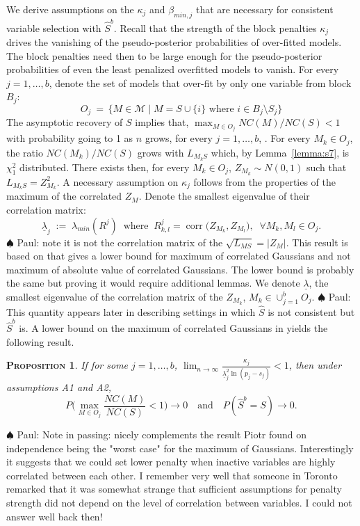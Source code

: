 \documentclass[aos]{imsart}
\theoremstyle{plain}
\newtheorem{prop}[thm]{\textsc{Proposition}}
\newcommand{\paul}[1]{{\small{\color{green} \sf $\spadesuit$ Paul: #1}}}
\newcommand{\M}{\mathcal{M}}
\begin{document}
We derive assumptions on the $\kappa_j$ and $\beta_{min,j}$ that are necessary for consistent variable selection with $\hat{S}^b$. Recall that the strength of the block penalties $\kappa_j$ drives the vanishing of the pseudo-posterior probabilities of over-fitted models. The block penalties need then to be large enough for the pseudo-posterior probabilities of even the least penalized overfitted models to vanish. For every $j=1,\ldots,b$, denote the set of models that over-fit by only one variable from block $B_j$:
$$O_j \:=\,\{M\in \M\;|\; M=S\cup\{i\} \text{ where } i\in B_j\setminus S_j\}$$
The asymptotic recovery of $S$ implies that, $\max_{M\in O_j}NC(M)/NC(S)<1$ with probability going to 1 as $n$ grows, for every $j=1,\ldots,b$, . For every $M_k\in O_j$, the ratio $NC(M_k)/NC(S)$ grows with $L_{M_kS}$ which, by Lemma~\ref{lemma:s7}, is $\chi^2_1$ distributed. There exists then, for every $M_k\in O_j$, $Z_{M_k} \sim N(0,1)$ such that $L_{M_kS}=Z_{M_k}^2$. A necessary assumption on $\kappa_j$ follows from the properties of the maximum of the correlated $Z_M$. Denote the smallest eigenvalue of their correlation matrix:
\begin{equation}
    \underline{\lambda}_j\;:=\;\lambda_{min}(R^j)\;\;\text{where} \;\;R^j_{k,l}=\operatorname{corr}\big(Z_{M_k},Z_{M_l}\big),\;\;\forall M_k,M_l \in O_j.
\end{equation}
\paul{note it is not the correlation matrix of the $\sqrt{L_{MS}}=|Z_M|$. This result is based on \cite{hartigan} that gives a lower bound for maximum of correlated Gaussians and not maximum of absolute value of correlated Gaussians. The lower bound is probably the same but proving it would require additional lemmas.}
We denote $\underline{\lambda}$, the smallest eigenvalue of the correlation matrix of the $Z_{M_k}$, $M_k\in\cup_{j=1}^b O_j$. \paul{This quantity appears later in describing settings in which $\hat S$ is not consistent but $\hat S^b$ is.}
A lower bound on the maximum of correlated Gaussians in \cite{hartigan} yields the following result.
\begin{prop}\label{prop:nectypeIreg}
     If for some $j=1,\ldots,b$,  $\lim_{n\to\infty}\frac{\kappa_j}{\underline{\lambda}_j^2\ln(p_j-s_j)} <1$, then under assumptions A1 and A2, $$P\Big(\max_{M\in O_j}\frac{NC(M)}{NC(S)}<1\Big)\to 0 \quad\text{and}\quad P(\hat{S}^b=S) \to 0.$$
\end{prop}

\paul{Note in passing: \cite{hartigan} nicely complements the result Piotr found on independence being the "worst case" for the maximum of Gaussians. Interestingly it suggests that we could set lower penalty when inactive variables are highly correlated between each other. I remember very well that someone in Toronto remarked that it was somewhat strange that sufficient assumptions for penalty strength did not depend on the level of correlation between variables. I could not answer well back then!}
\end{document}
